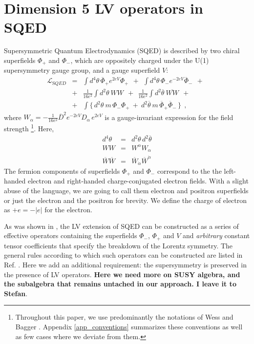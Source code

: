 \documentclass[paper,12pt]{revtex4}
\begin{document}
\section{Dimension 5 LV operators in SQED}
\label{Dim5LV}


	Supersymmetric Quantum Electrodynamics (SQED) is described
	by two chiral superfields $ \Phi_+ $ and $ \Phi_- $, which
	are oppositely charged under the U(1) supersymmetry gauge
	group, and a gauge superfield $ V $: 
\begin{eqnarray}
\nonumber
	\mathcal{L}_{\mathrm SQED} & =
&	
	\int d^4\theta\, 
	   \overline{\Phi}_+ e^{2eV} \Phi_+ ~~+~~
	\int d^4\theta\,
	   \Phi_- e^{-2eV} \overline{\Phi}_- ~~+~~ \\
\label{SQED}
& 
	+ &
	\frac{1}{16e^2} \int d^2\theta~
	WW ~~+~~
	\frac{1}{16e^2} \int d^2\overline{\theta}~
	\overline{WW} ~~+~~ \\
\nonumber
& 
	+ &
	\int \{\, d^2\theta~ m\, \Phi_-\Phi_+ ~+~
	         d^2\overline{\theta}~ 
		 m\, \overline{\Phi}_+\overline{\Phi}_-\,
             \}~~,
\end{eqnarray}
	where 
  $ W_\alpha = - \frac{1}{16e^2} \overline{D}^2 
	e^{-2eV} D_\alpha\, e^{2eV} $ 
	is a gauge-invariant expression for the field strength
\footnote{
	Throughout this paper, we use predominantly the notations of Wess and Bagger
\cite{Wess:1992cp}.
	Appendix 
\ref{app_conventions} summarizes these conventions as well as few cases where we deviate from them.
	}.
	Here, 
\begin{eqnarray*}
	d^4 \theta & = & d^2\theta\, d^2\overline{\theta} \\
	W W & = & W^\alpha W_\alpha \\
        \overline{W}\overline{W} & = & 
		\overline{W}_{\dot\alpha} \overline{W}^{\dot\alpha}
\end{eqnarray*}
	The fermion components of superfields $ \Phi_+ $ and $ \Phi_- $ correspond to the the 
    left-handed electron and right-handed charge-conjugated electron fields. With a 
slight abuse of the language, we are going to call them electron and positron 
	superfields or just the electron and the positron for brevity. We define the charge 
of electron as 	$ + e = - | e | $ for the electron.

As was shown in \cite{GrootNibbelink:2004za}, the LV extension of SQED can be 
constructed as a series of effective operators containing the superfields 
$\Phi_-$, $\Phi_+$ and $V$ and {\em arbitrary} constant tensor coefficients 
that specify the breakdown of the Lorentz symmetry. The general rules according to 
which such operators can be constructed are listed in Ref. \cite{MP:}.  Here we 
add an additional requirement: the supersymmetry is preserved in the presence of 
LV operators. {\bf Here we need more on SUSY algebra, and the subalgebra that remains 
untached in our approach. I leave it to Stefan}. 
\end{document}
